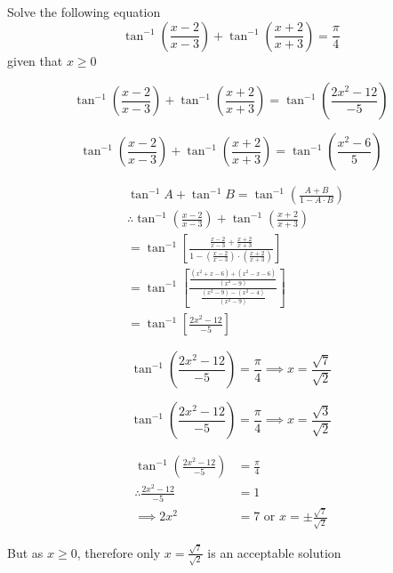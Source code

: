 \documentclass[14pt,fleqn]{extarticle}
\newcommand\xsqtw{ \left(x^2 - 4 \right) }
\newcommand\xsqth{ \left(x^2 - 9 \right)}
\begin{document}
\begin{question}
	\statement 
    
    Solve the following equation 
    \[ \tan^{-1} \left(\frac{x-2}{x-3} \right) + \tan^{-1} \left(\frac{x+2}{x+3} \right) = \frac\pi{4} \]
    given that $x \geq 0$ 
    
    \begin{step}
  \begin{options} 
     \correct 
       \small\[ \tan^{-1} \left(\frac{x-2}{x-3} \right) + \tan^{-1} \left(\frac{x+2}{x+3} \right) = \tan^{-1} \left( \frac{2x^2 - 12}{-5}\right)\]
     \incorrect
        
        \[ \tan^{-1} \left(\frac{x-2}{x-3} \right) + \tan^{-1} \left(\frac{x+2}{x+3} \right) = \tan^{-1} \left( \frac{x^2 - 6}{5}\right)\]
    \end{options} 
     \reason 
     
     \begin{align}
	&\tan^{-1} A + \tan^{-1} B = \tan^{-1} \left(\frac{A + B}{1-A\cdot B} \right) \\
	&\therefore \tan^{-1} \left(\frac{x-2}{x-3} \right) + \tan^{-1} \left(\frac{x+2}{x+3} \right) \\
	&= \tan^{-1} \left[ \frac{\frac{x-2}{x-3} + \frac{x+2}{x+3}}{1- \left(\frac{x-2}{x-3} \right)\cdot \left(\frac{x+2}{x+3} \right)} \right]  \\
	&= \tan^{-1} \left[ \frac{\frac{\left(x^2+x-6 \right) + \left(x^2 - x - 6 \right)}{\xsqth}}{\frac{\xsqth-\xsqtw}{\xsqth}} \right] \\
	&= \tan^{-1} \left[\frac{2x^2 - 12}{-5} \right]
\end{align}
       
\end{step}     

\begin{step}
  \begin{options} 
     \correct 
       
       \[ \tan^{-1} \left(\frac{2x^2-12}{-5} \right) = \frac\pi{4} \implies x = \frac{\sqrt{7}}{\sqrt{2}} \]
     \incorrect
        
         \[ \tan^{-1} \left(\frac{2x^2-12}{-5} \right) = \frac\pi{4} \implies x = \frac{\sqrt{3}}{\sqrt{2}} \]
    \end{options} 
     \reason 
       
       \begin{align}
       \tan^{-1} \left(\frac{2x^2-12}{-5} \right) &= \frac\pi{4} \\ 
       \therefore \frac{2x^2 - 12}{-5} &= 1 \\ 
       \implies 2x^2 &= 7\text{ or } x = \pm \frac{\sqrt{7}}{\sqrt{2}}
\end{align}

But as $x \geq 0$, therefore only $x = \frac{\sqrt{7}}{\sqrt{2}}$ is an acceptable solution 
\end{step} 
\end{question} 
\end{document}
